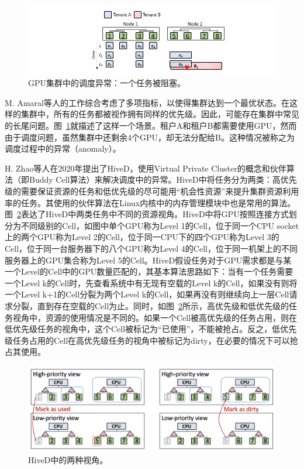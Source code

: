 \begin{figure}[h]
    \centerline{\includegraphics[width=\textwidth]{figures/hived-pendding.png}}
    \caption{GPU集群中的调度异常：一个任务被阻塞。}
    \label{hived_pending}
\end{figure}

M. Amaral等人的工作综合考虑了多项指标，以使得集群达到一个最优状态。在这样的集群中，所有的任务都被视作拥有同样的优先级。因此，可能存在集群中常见的长尾问题。图~\ref{hived_pending}就描述了这样一个场景。租户A和租户B都需要使用GPU，然而由于调度问题，虽然集群中还剩余4个GPU，却无法分配给B。这种情况被称之为调度过程中的异常（anomaly）。

H. Zhao等人在2020年提出了HiveD\parencite{zhao2020hived}，使用Virtual Private Cluster的概念和伙伴算法（即Buddy Cell算法）来解决调度中的异常。HiveD中将任务分为两类：高优先级的需要保证资源的任务和低优先级的尽可能用“机会性资源”来提升集群资源利用率的任务。其使用的伙伴算法在Linux内核中的内存管理模块中也是常用的算法。图~\ref{hived_diff_view}表达了HiveD中两类任务中不同的资源视角。HiveD中将GPU按照连接方式划分为不同级别的Cell，如图中单个GPU称为Level 1的Cell，位于同一个CPU socket上的两个GPU称为Level 2的Cell，位于同一CPU下的四个GPU称为Level 3的Cell，位于同一台服务器下的八个GPU称为Level 4的Cell，位于同一机架上的不同服务器上的GPU集合称为Level 5的Cell。HiveD假设任务对于GPU需求都是与某一个Level的Cell中的GPU数量匹配的，其基本算法思路如下：当有一个任务需要一个Level k的Cell时，先查看系统中有无现有空载的Level k的Cell，如果没有则将一个Level k+1的Cell分裂为两个Level k的Cell，如果再没有则继续向上一层Cell请求分裂，直到存在空载的Cell为止。同时，如图~\ref{hived_diff_view}所示，高优先级和低优先级的任务视角中，资源的使用情况是不同的。如果一个Cell被高优先级的任务占用，则在低优先级任务的视角中，这个Cell被标记为“已使用”，不能被抢占。反之，低优先级任务占用的Cell在高优先级任务的视角中被标记为dirty，在必要的情况下可以抢占其使用。

\begin{figure}[h]
    \centerline{\includegraphics[width=\textwidth]{figures/hived-diff-view.png}}
    \caption{HiveD中的两种视角。}
    \label{hived_diff_view}
\end{figure}

